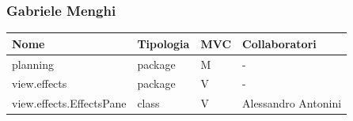 \documentclass[a4paper,12pt]{report}
\begin{document}
\subsubsection{Gabriele Menghi}
\begin{center}
\begin{longtable}{| m{22.5em} | m{2cm}| m{1cm} | m{2.5cm} |} 
 \hline
 Nome & Tipologia & MVC & Collaboratori \\ [0.5ex]
 \hline
  planning & package & M & - \\
 \hline
 view.effects & package & V & - \\
 \hline
view.effects.EffectsPane & class & V & Alessandro Antonini \\
\hline
 \end{longtable}
 \end{center}



\endsubsubsection
\end{document}
